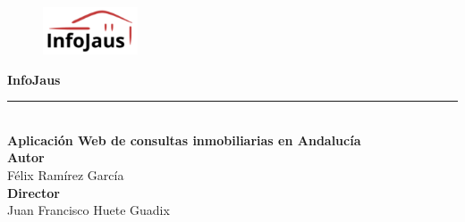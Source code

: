 
\centering

\vspace{3.3cm}
\begin{figure}[htb]
	\centering
	\includegraphics[width=0.25\textwidth]{./imagenes/logo.png}
\end{figure}
\vspace{0.5cm}
{\Huge\bfseries InfoJaus\\}
\noindent\rule[-1ex]{\textwidth}{3pt}\\[3.5ex]
{\large\bfseries Aplicación Web de consultas inmobiliarias en Andalucía\\[4cm]}
\textbf{Autor}\\ {Félix Ramírez García}\\[1.0ex]
\textbf{Director}\\ {Juan Francisco Huete Guadix}\\[0.5cm]